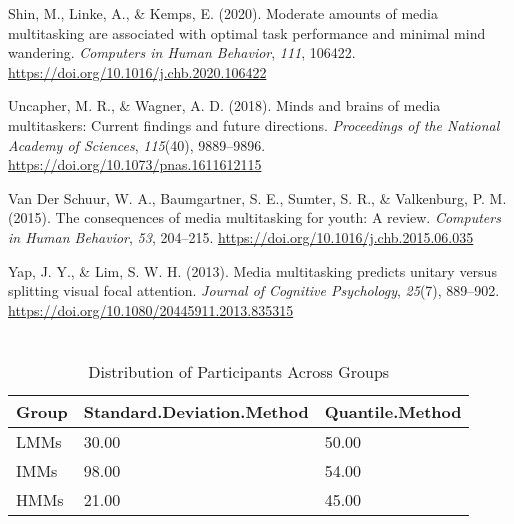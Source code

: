 \documentclass[
  man]{apa7}
\newlength{\cslhangindent}
\newenvironment{CSLReferences}[2] %
 {\begin{list}{}{%
  \setlength{\itemindent}{0pt}
  \setlength{\leftmargin}{0pt}
  \setlength{\parsep}{0pt}
  \ifodd #1
   \setlength{\leftmargin}{\cslhangindent}
   \setlength{\itemindent}{-1\cslhangindent}
  \fi
  \setlength{\itemsep}{#2\baselineskip}}}
 {\end{list}}
\begin{document}
\begin{CSLReferences}{1}{0}
Shin, M., Linke, A., \& Kemps, E. (2020). Moderate amounts of media multitasking are associated with optimal task performance and minimal mind wandering. \emph{Computers in Human Behavior}, \emph{111}, 106422. \url{https://doi.org/10.1016/j.chb.2020.106422}

Uncapher, M. R., \& Wagner, A. D. (2018). Minds and brains of media multitaskers: {Current} findings and future directions. \emph{Proceedings of the National Academy of Sciences}, \emph{115}(40), 9889--9896. \url{https://doi.org/10.1073/pnas.1611612115}

Van Der Schuur, W. A., Baumgartner, S. E., Sumter, S. R., \& Valkenburg, P. M. (2015). The consequences of media multitasking for youth: {A} review. \emph{Computers in Human Behavior}, \emph{53}, 204--215. \url{https://doi.org/10.1016/j.chb.2015.06.035}

Yap, J. Y., \& Lim, S. W. H. (2013). Media multitasking predicts unitary versus splitting visual focal attention. \emph{Journal of Cognitive Psychology}, \emph{25}(7), 889--902. \url{https://doi.org/10.1080/20445911.2013.835315}

\end{CSLReferences}

\newpage

\appendix


\section{}\label{section}

\begin{table}[tbp]

\begin{center}
\begin{threeparttable}

\caption{\label{tab:unnamed-chunk-7}Distribution of Participants Across Groups}

\begin{tabular}{lll}
\toprule
Group & \multicolumn{1}{c}{Standard.Deviation.Method} & \multicolumn{1}{c}{Quantile.Method}\\
\midrule
LMMs & 30.00 & 50.00\\
IMMs & 98.00 & 54.00\\
HMMs & 21.00 & 45.00\\
\bottomrule
\end{tabular}

\end{threeparttable}
\end{center}

\end{table}
\end{document}
